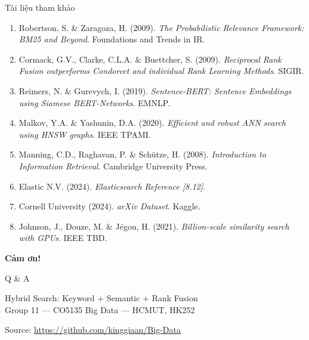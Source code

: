 
\begin{frame}[allowframebreaks]{Tài liệu tham khảo}
{\small
\begin{enumerate}
    \item Robertson, S. \& Zaragoza, H. (2009). \textit{The Probabilistic Relevance Framework: BM25 and Beyond}. Foundations and Trends in IR.
    \item Cormack, G.V., Clarke, C.L.A. \& Buettcher, S. (2009). \textit{Reciprocal Rank Fusion outperforms Condorcet and individual Rank Learning Methods}. SIGIR.
    \item Reimers, N. \& Gurevych, I. (2019). \textit{Sentence-BERT: Sentence Embeddings using Siamese BERT-Networks}. EMNLP.
    \item Malkov, Y.A. \& Yashunin, D.A. (2020). \textit{Efficient and robust ANN search using HNSW graphs}. IEEE TPAMI.
    \item Manning, C.D., Raghavan, P. \& Schütze, H. (2008). \textit{Introduction to Information Retrieval}. Cambridge University Press.
    \item Elastic N.V. (2024). \textit{Elasticsearch Reference [8.12]}.
    \item Cornell University (2024). \textit{arXiv Dataset}. Kaggle.
    \item Johnson, J., Douze, M. \& Jégou, H. (2021). \textit{Billion-scale similarity search with GPUs}. IEEE TBD.
\end{enumerate}
}
\end{frame}

\begin{frame}[plain]
\begin{center}

\vspace{2cm}
{\Huge\textbf{\textcolor{accentTeal}{Cảm ơn!}}}

\vspace{0.5cm}
{\LARGE Q \& A}

\vspace{1cm}

{\large\textcolor{textLight}{Hybrid Search: Keyword + Semantic + Rank Fusion}}\\[0.3cm]
{\small\textcolor{textMuted}{Group 11 --- CO5135 Big Data --- HCMUT, HK252}}

\vspace{0.8cm}
{\small\textcolor{textMuted}{Source: \url{https://github.com/kinggiaan/Big-Data}}}

\end{center}
\end{frame}
